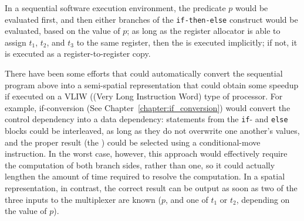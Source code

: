 In a sequential software execution environment, the predicate $p$ would be evaluated first, and then either branches of the {\tt if-then-else} construct would be evaluated, based on the value of $p$;  as long as the register allocator is able to assign $t_1$, $t_2$, and $t_3$ to the same register, then the \phifun is executed implicitly;  if not, it is executed as a register-to-register copy.

There have been some efforts that could automatically convert the sequential program above into a semi-spatial representation that could obtain some speedup if executed on a VLIW ((Very Long Instruction Word) type of processor. 
For example, if-conversion (See Chapter~\ref{chapter:if_conversion}) would convert the control dependency into a data dependency:  statements from the {\tt if}- and {\tt else} blocks could be interleaved, as long as they do not overwrite one another's values, and the proper result (the \phifun) could be selected using a conditional-move instruction. In the worst case, however, this approach would effectively require the computation of both branch sides, rather than one, so it could actually lengthen the amount of time required to resolve the computation. 
In a spatial representation, in contrast, the correct result can be output as soon as two of the three inputs to the multiplexer are known ($p$, and one of $t_1$ or $t_2$, depending on the value of $p$).

%

